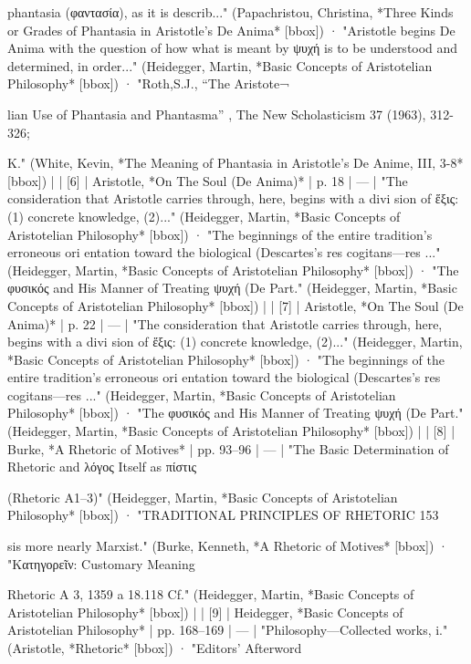 phantasia (φαντασία), as it is describ..." (Papachristou, Christina, *Three Kinds or Grades of Phantasia in Aristotle's De Anima* [bbox]) · "Aristotle begins De Anima with the question of how what is meant by ψυχή is to be understood and determined, in order..." (Heidegger, Martin, *Basic Concepts of Aristotelian Philosophy* [bbox]) · "Roth,S.J., “The Aristote¬

lian Use of Phantasia and Phantasma” , The New Scholasticism 37 (1963), 312-326;

K." (White, Kevin, *The Meaning of Phantasia in Aristotle's De Anime, III, 3-8* [bbox]) |
| [6] | Aristotle, *On The Soul (De Anima)* | p. 18 | — | "The consideration that Aristotle carries through, here, begins with a divi­ sion of ἕξις: (1) concrete knowledge, (2)..." (Heidegger, Martin, *Basic Concepts of Aristotelian Philosophy* [bbox]) · "The beginnings of the entire tradition’s erroneous ori­ entation toward the biological (Descartes’s res cogitans—res ..." (Heidegger, Martin, *Basic Concepts of Aristotelian Philosophy* [bbox]) · "The φυσικός and His Manner of Treating ψυχή (De Part." (Heidegger, Martin, *Basic Concepts of Aristotelian Philosophy* [bbox]) |
| [7] | Aristotle, *On The Soul (De Anima)* | p. 22 | — | "The consideration that Aristotle carries through, here, begins with a divi­ sion of ἕξις: (1) concrete knowledge, (2)..." (Heidegger, Martin, *Basic Concepts of Aristotelian Philosophy* [bbox]) · "The beginnings of the entire tradition’s erroneous ori­ entation toward the biological (Descartes’s res cogitans—res ..." (Heidegger, Martin, *Basic Concepts of Aristotelian Philosophy* [bbox]) · "The φυσικός and His Manner of Treating ψυχή (De Part." (Heidegger, Martin, *Basic Concepts of Aristotelian Philosophy* [bbox]) |
| [8] | Burke, *A Rhetoric of Motives* | pp. 93–96 | — | "The Basic Determination of Rhetoric and λόγος Itself as πίστις

(Rhetoric Α1–3)" (Heidegger, Martin, *Basic Concepts of Aristotelian Philosophy* [bbox]) · "TRADITIONAL PRINCIPLES OF RHETORIC 153

sis more nearly Marxist." (Burke, Kenneth, *A Rhetoric of Motives* [bbox]) · "Κατηγορεῖν: Customary Meaning

Rhetoric A 3, 1359 a 18.118 Cf." (Heidegger, Martin, *Basic Concepts of Aristotelian Philosophy* [bbox]) |
| [9] | Heidegger, *Basic Concepts of Aristotelian Philosophy* | pp. 168–169 | — | "Philosophy—Collected works, i." (Aristotle, *Rhetoric* [bbox]) · "Editors' Afterword

